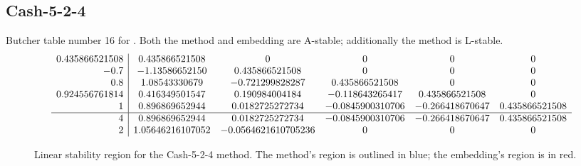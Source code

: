 \documentclass[letterpaper,10pt,english]{sphinxmanual}
\begin{document}
\subsection{Cash-5-2-4}
\label{Butcher:butcher-cash-5-2-4}\label{Butcher:cash-5-2-4}
Butcher table number 16
for {\hyperref[c_interface/User_callable:c.ARKodeSetIRKTableNum]{\emph{}}}.  Both the
method and embedding are A-stable; additionally the method is L-stable.
\begin{gather}
\begin{split}\begin{array}{r|ccccc}
  0.435866521508 & 0.435866521508 & 0 & 0 & 0 & 0 \\
  -0.7 & -1.13586652150 & 0.435866521508 & 0 & 0 & 0 \\
  0.8 & 1.08543330679 & -0.721299828287 & 0.435866521508 & 0 & 0 \\
  0.924556761814 & 0.416349501547 & 0.190984004184 & -0.118643265417 & 0.435866521508 & 0 \\
  1 & 0.896869652944 & 0.0182725272734 & -0.0845900310706 & -0.266418670647 & 0.435866521508 \\
  \hline
  4 & 0.896869652944 & 0.0182725272734 & -0.0845900310706 & -0.266418670647 & 0.435866521508 \\
  2 & 1.05646216107052 & -0.0564621610705236 & 0 & 0 & 0
\end{array}\end{split}\notag
\end{gather}\begin{figure}[htbp]
\centering
\capstart

\caption{Linear stability region for the Cash-5-2-4 method.  The method's
region is outlined in blue; the embedding's region is in red.}\end{figure}
\end{document}
